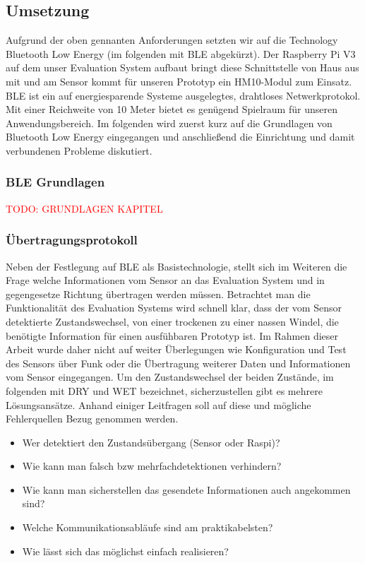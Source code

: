 \subsection{Umsetzung}
Aufgrund der oben gennanten Anforderungen setzten wir auf die Technology Bluetooth Low Energy (im folgenden mit BLE abgekürzt). Der Raspberry Pi V3 auf dem unser Evaluation System aufbaut bringt diese Schnittstelle von Haus aus mit und am Sensor kommt für unseren Prototyp ein HM10-Modul zum Einsatz. BLE ist ein auf energiesparende Systeme ausgelegtes, drahtloses Netwerkprotokol. Mit einer Reichweite von 10 Meter \cite{ble_spec} bietet es genügend Spielraum für unseren Anwendungsbereich. Im folgenden wird zuerst kurz auf die Grundlagen von Bluetooth Low Energy eingegangen und anschließend die Einrichtung und damit verbundenen Probleme diskutiert. 

\subsubsection{BLE Grundlagen}
\textcolor{red}{TODO: GRUNDLAGEN KAPITEL}

\subsubsection{Übertragungsprotokoll}
\label{subsubsec:unser_protokoll}

Neben der Festlegung auf BLE als Basistechnologie, stellt sich im Weiteren die Frage welche Informationen vom Sensor an das Evaluation System und in gegengesetze Richtung übertragen werden müssen. Betrachtet man die Funktionalität des Evaluation Systems wird schnell klar, dass der vom Sensor detektierte Zustandswechsel, von einer trockenen zu einer nassen Windel, die benötigte Information für einen ausfühbaren Prototyp ist. Im Rahmen dieser Arbeit wurde daher nicht auf weiter Überlegungen wie Konfiguration und Test des Sensors über Funk oder die Übertragung weiterer Daten und Informationen vom Sensor eingegangen. Um den Zustandswechsel der beiden Zustände, im folgenden mit DRY und WET bezeichnet, sicherzustellen gibt es mehrere Lösungsansätze. Anhand einiger Leitfragen soll auf diese und mögliche Fehlerquellen Bezug genommen werden.

\begin{itemize}
  \item Wer detektiert den Zustandsübergang (Sensor oder Raspi)?
  \item Wie kann man falsch bzw mehrfachdetektionen verhindern?
  \item Wie kann man sicherstellen das gesendete Informationen auch angekommen sind?
  \item Welche Kommunikationsabläufe sind am praktikabelsten?
  \item Wie lässt sich das möglichst einfach realisieren?
\end{itemize}

